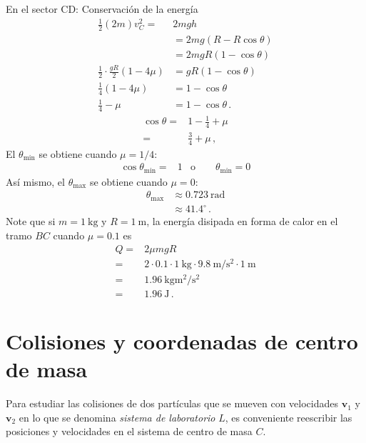 En el sector CD: Conservación de la energía
\begin{align}
  \tfrac{1}{2}(2m)v_C^2=&2mgh\nonumber\\
&=2mg(R-R\cos\theta)\nonumber\\
&=2mgR(1-\cos\theta)\nonumber\\
  \frac{1}{2}\cdot\frac{gR}{2}\left(1-4\mu \right)&=gR(1-\cos\theta)\nonumber\\
  \frac{1}{4}\left(1-4\mu \right)&=1-\cos\theta\nonumber\\
  \frac{1}{4}-\mu&=1-\cos\theta\,.
\end{align}
\begin{align}
  \cos\theta=&1-\frac{1}{4}+\mu\nonumber\\
  =&\frac{3}{4}+\mu\,,
\end{align}
El $\theta_{\text{min}}$ se obtiene cuando $\mu=1/4$:
\begin{align}
 \cos \theta_{\text{min}}=&1 &\text{o} \qquad \theta_{\text{min}}=0
\end{align}
Así mismo, el $\theta_{\text{max}}$ se obtiene cuando $\mu=0$:
\begin{align}
  \theta_{\text{max}}&\approx 0.723\ \text{rad}\nonumber\\
&\approx 41.4^\circ\,.
\end{align}
Note que si $m=\SI{1}{\kilo\gram}$ y $R=\SI{1}{\meter}$, la energía disipada en
forma de calor en el tramo $BC$ cuando $\mu=0.1$ es
\begin{align}
  Q=&2 \mu m g R\nonumber\\
  =&2\cdot 0.1\cdot \SI{1}{\kilo\gram}\cdot \SI{9.8}{\meter\per\second^2}\cdot
  \SI{1}{\meter}\nonumber\\
  =&\SI{1.96}{\kilo\gram \meter^2\per\second^2}\nonumber\\
  =&\SI{1.96}{\joule}\,.
\end{align}

\finejemplo





\section{Colisiones y coordenadas de centro de masa}
Para estudiar las colisiones de dos partículas que se mueven con
velocidades $\mathbf{v}_1$ y $\mathbf{v}_2$ en lo que se denomina \emph{sistema de
  laboratorio} $L$, es conveniente reescribir las posiciones y velocidades
en el sistema de centro de masa $C$.

